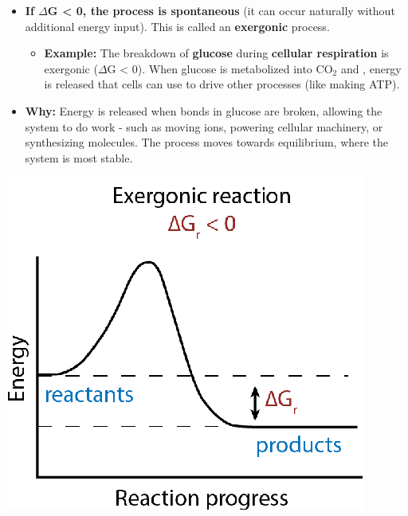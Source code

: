 \documentclass[10pt]{article}
\newcommand{\water}{\text{H$_2$O}}
\begin{document}
\begin{itemize}
    \item \textbf{If $\Delta$G < 0, the process is spontaneous} (it can occur naturally without additional energy input).  This is called an \textbf{exergonic} process.
    \begin{itemize}
        \item \textbf{Example:} The breakdown of \textbf{glucose} during \textbf{cellular respiration} is exergonic ($\Delta$G < 0).  When glucose is metabolized into CO$_2$ and \water, energy is released that cells can use to drive other processes (like making ATP).
    \end{itemize}
    \item \textbf{Why:} Energy is released when bonds in glucose are broken, allowing the system to do work - such as moving ions, powering cellular machinery, or synthesizing molecules.  The process moves towards equilibrium, where the system is most stable.
\end{itemize}
\begin{center}
    \includegraphics*[scale=0.9]{L3_10.png}
\end{center}
\end{document}
